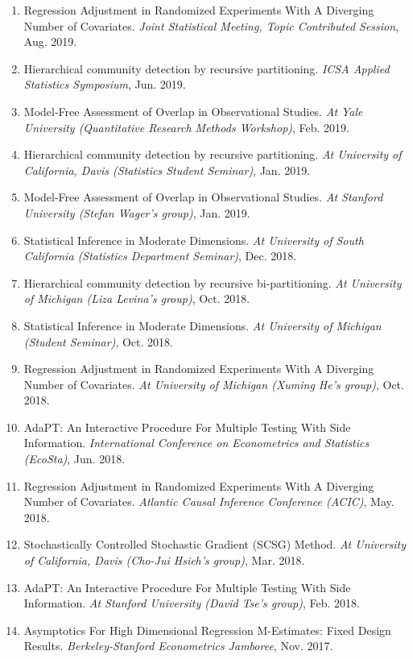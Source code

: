 \documentclass{article}
\begin{document}
\begin{enumerate}
\item Regression Adjustment in Randomized Experiments With A Diverging Number of Covariates. \emph{Joint Statistical Meeting, Topic Contributed Session}, Aug. 2019.
\item Hierarchical community detection by recursive partitioning. \emph{ICSA Applied Statistics Symposium}, Jun. 2019.
\item Model-Free Assessment of Overlap in Observational Studies. \emph{At Yale University (Quantitative Research Methods Workshop)}, Feb. 2019.
\item Hierarchical community detection by recursive partitioning. \emph{At University of California, Davis (Statistics Student Seminar)}, Jan. 2019.
\item Model-Free Assessment of Overlap in Observational Studies. \emph{At Stanford University (Stefan Wager's group)}, Jan. 2019.
\item Statistical Inference in Moderate Dimensions. \emph{At University of South California (Statistics Department Seminar)}, Dec. 2018.
\item Hierarchical community detection by recursive bi-partitioning. \emph{At University of Michigan (Liza Levina's group)}, Oct. 2018.
\item Statistical Inference in Moderate Dimensions. \emph{At University of Michigan (Student Seminar)}, Oct. 2018.
\item Regression Adjustment in Randomized Experiments With A Diverging Number of Covariates. \emph{At University of Michigan (Xuming He's group)}, Oct. 2018.
\item AdaPT: An Interactive Procedure For Multiple Testing With Side Information. \emph{International Conference on Econometrics and Statistics (EcoSta)}, Jun. 2018.
\item Regression Adjustment in Randomized Experiments With A Diverging Number of Covariates. \emph{Atlantic Causal Inference Conference (ACIC)}, May. 2018.
\item Stochastically Controlled Stochastic Gradient (SCSG) Method. \emph{At University of California, Davis (Cho-Jui Hsieh's group)}, Mar. 2018.
\item AdaPT: An Interactive Procedure For Multiple Testing With Side Information. \emph{At Stanford University (David Tse's group)}, Feb. 2018.
\item Asymptotics For High Dimensional Regression M-Estimates: Fixed Design Results. \emph{Berkeley-Stanford Econometrics Jamboree}, Nov. 2017. 
\end{enumerate}
 
\end{document}

